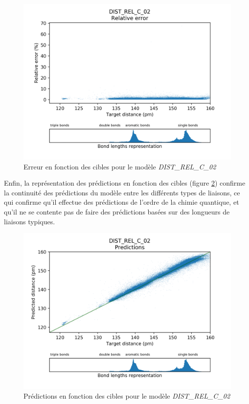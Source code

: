 \begin{figure}
	\centering
	
	\includegraphics[scale=0.7]{../figures/DIST_REL_C_02/DIST_REL_C_02_distrib_rmse_dist.png}	
	
	\caption{Erreur en fonction des cibles pour le modèle \emph{DIST\_REL\_C\_02}}
	\label{fdistrib_err_rel_dist_rel_c_02}
	\end{figure}

\par Enfin, la représentation des prédictions en fonction des cibles (figure \ref{fpred_targets_dist_rel_c_02}) confirme la continuité des prédictions du modèle entre les différents types de liaisons, ce qui confirme qu'il effectue des prédictions de l'ordre de la chimie quantique, et qu'il ne se contente pas de faire des prédictions basées sur des longueurs de liaisons typiques.

\begin{figure}
	\centering
	
	\includegraphics[scale=0.7]{../figures/DIST_REL_C_02/DIST_REL_C_02_preds_targets.png}	
	
	\caption{Prédictions en fonction des cibles pour le modèle \emph{DIST\_REL\_C\_02}}
	\label{fpred_targets_dist_rel_c_02}
	
\end{figure}

